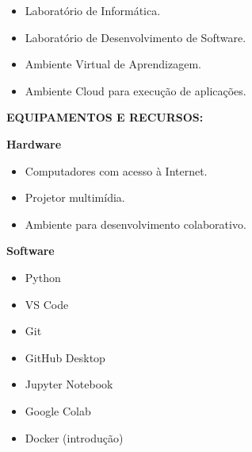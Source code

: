 \begin{itemize}
\item Laboratório de Informática.
\item Laboratório de Desenvolvimento de Software.
\item Ambiente Virtual de Aprendizagem.
\item Ambiente Cloud para execução de aplicações.
\end{itemize}

\textbf{EQUIPAMENTOS E RECURSOS:}

\textbf{Hardware}

\begin{itemize}
\item Computadores com acesso à Internet.
\item Projetor multimídia.
\item Ambiente para desenvolvimento colaborativo.
\end{itemize}

\textbf{Software}

\begin{itemize}
\item Python
\item VS Code
\item Git
\item GitHub Desktop
\item Jupyter Notebook
\item Google Colab
\item Docker (introdução)
\end{itemize}
